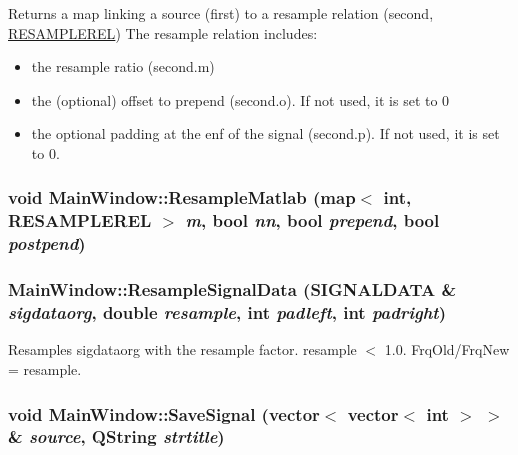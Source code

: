 Returns a map linking a source (first) to a resample relation (second, \hyperlink{struct_r_e_s_a_m_p_l_e_r_e_l}{RESAMPLEREL}) The resample relation includes:\begin{itemize}
\item the resample ratio (second.m)\item the (optional) offset to prepend (second.o). If not used, it is set to 0\item the optional padding at the enf of the signal (second.p). If not used, it is set to 0. \end{itemize}
\hypertarget{class_main_window_2e4c88aec42d6244ceaf0ac564d43f23}{
\subsubsection[{ResampleMatlab}]{\setlength{\rightskip}{0pt plus 5cm}void MainWindow::ResampleMatlab (map$<$ int, {\bf RESAMPLEREL} $>$ {\em m}, \/  bool {\em nn}, \/  bool {\em prepend}, \/  bool {\em postpend})}}
\label{class_main_window_2e4c88aec42d6244ceaf0ac564d43f23}


\hypertarget{class_main_window_496968f7b572ee11dd55660040d98408}{
\subsubsection[{ResampleSignalData}]{ MainWindow::ResampleSignalData ({\bf SIGNALDATA} \& {\em sigdataorg}, \/  double {\em resample}, \/  int {\em padleft}, \/  int {\em padright})}}
\label{class_main_window_496968f7b572ee11dd55660040d98408}


Resamples sigdataorg with the resample factor. resample $<$ 1.0. FrqOld/FrqNew = resample. 

\hypertarget{class_main_window_b4cc8338a8cb35f9fa06e503d9fa33e4}{
\subsubsection[{SaveSignal}]{\setlength{\rightskip}{0pt plus 5cm}void MainWindow::SaveSignal (vector$<$ vector$<$ int $>$ $>$ \& {\em source}, \/  QString {\em strtitle})}}
\label{class_main_window_b4cc8338a8cb35f9fa06e503d9fa33e4}


